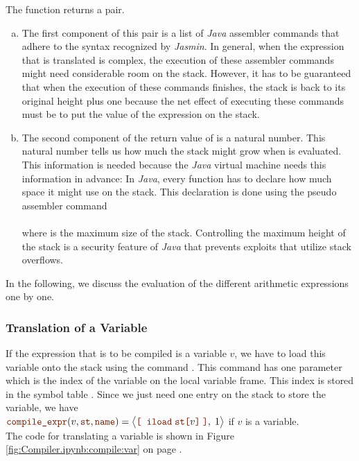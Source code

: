 The function  returns a pair.  
\begin{enumerate}[(a)]
\item The first component of this pair is a list of \textsl{Java} 
      assembler commands that adhere to the syntax recognized by \textsl{Jasmin}.  In general, when the
      expression that is translated is complex, the execution of these assembler commands might need
      considerable room on the stack.  However, it has to be guaranteed that when the execution of these
      commands finishes, the stack is back to its original height plus one because the net 
      effect of executing these commands must be to put the value of the expression on the stack.
\item The second component of the return value of  is a natural number.
      This natural number tells us how much the stack might grow when  is evaluated.
      This information is needed because the \textsl{Java} virtual machine needs this information in advance:
      In \textsl{Java}, every function has to declare how much space it might use on the stack.
      This declaration is done using the pseudo assembler command
      \\[0.2cm]
      \hspace*{1.3cm}
       
      \\[0.2cm]
      where  is the maximum size of the stack.  Controlling the 
      maximum height of the stack is a security feature of \textsl{Java} that prevents exploits that
      utilize stack overflows.
\end{enumerate}
In the following, we discuss the evaluation of the different arithmetic expressions one by one.


\subsubsection{Translation of a Variable}
If the expression that is to be compiled is a variable $v$, we have to load this variable onto the stack using
the command .  This command has one parameter which is the index of the variable on the local
variable frame.  This index is stored in the symbol table .  Since we just need one entry on the
stack to store the variable, we have
\\[0.2cm]
\hspace*{1.3cm}
$\mytt{compile\_expr}(v, \mytt{st}, \mytt{name}) = 
 \bigl\langle\mytt{[}\;\; \mytt{iload}\; \mytt{st[}v\mytt{]}\; \mytt{]}, \; 1\bigr\rangle$ \quad
 if $v$ is a variable.
\\[0.2cm]
The code for translating a variable is shown in Figure \ref{fig:Compiler.ipynb:compile:var} on page
\pageref{fig:Compiler.ipynb:compile:var}.

